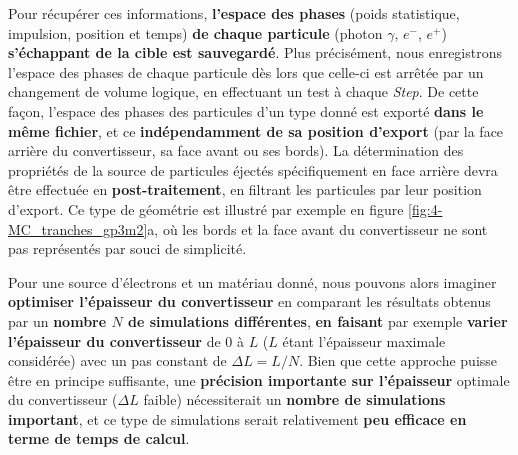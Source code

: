 \begin{refsection}
Pour récupérer ces informations, \textbf{l'espace des phases} (poids statistique, impulsion, position et temps) \textbf{de chaque particule} (photon $\gamma$, $e^-$, $e^+$) \textbf{s'échappant de la cible est sauvegardé}. Plus précisément, nous enregistrons l'espace des phases de chaque particule dès lors que celle-ci est arrêtée par un changement de volume logique, en effectuant un test à chaque \textit{Step}. De cette façon, l'espace des phases des particules d'un type donné est exporté \textbf{dans le même fichier}, et ce \textbf{indépendamment de sa position d'export} (par la face arrière du convertisseur, sa face avant ou ses bords). La détermination des propriétés de la source de particules éjectés spécifiquement en face arrière devra être effectuée en \textbf{post-traitement}, en filtrant les particules par leur position d'export. Ce type de géométrie est illustré par exemple en figure \ref{fig:4-MC_tranches_gp3m2}a, où les bords et la face avant du convertisseur ne sont pas représentés par souci de simplicité.

Pour une source d'électrons et un matériau donné, nous pouvons alors imaginer \textbf{optimiser l'épaisseur du convertisseur} en comparant les résultats obtenus par un \textbf{nombre $N$ de simulations différentes}, \textbf{en faisant} par exemple \textbf{varier l'épaisseur du convertisseur} de $0$ à $L$ ($L$ étant l'épaisseur maximale considérée) avec un pas constant de $\Delta L = L/N$. 
Bien que cette approche puisse être en principe suffisante, une \textbf{précision importante sur l'épaisseur} optimale du convertisseur ($\Delta L$ faible) nécessiterait un \textbf{nombre de simulations important}, et ce type de simulations serait relativement \textbf{peu efficace en terme de temps de calcul}.


\end{refsection}
